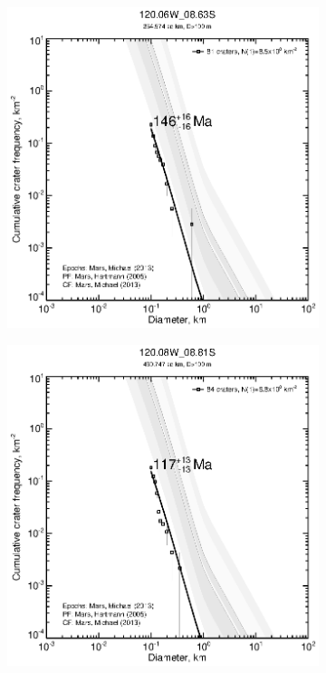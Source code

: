 \documentclass[12pt,letter]{article}
\begin{document}
\begin{figure}[h]
\begin{subfigure}{.33\textwidth}
\end{subfigure}
\begin{subfigure}{.33\textwidth}
  \includegraphics[width=\linewidth,clip,trim=1cm 1cm 1.5cm 1cm]{figures/craterstats/120-06W_08-63S_100m_cum.eps}
\end{subfigure}
\begin{subfigure}{.33\textwidth}
  \includegraphics[width=\linewidth,clip,trim=1cm 1cm 1.5cm 1cm]{figures/craterstats/120-08W_08-81S_100m_cum.eps}

\end{subfigure}
\end{figure}
\end{document}
